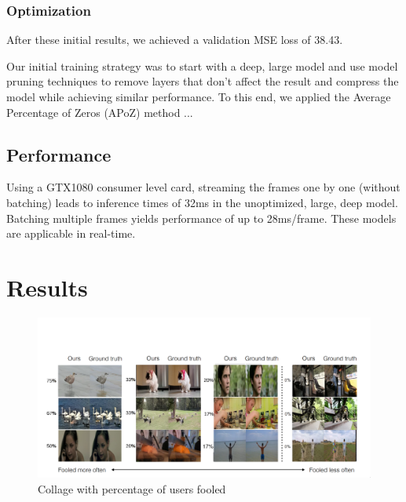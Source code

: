 \documentclass[12pt,openright,oneside,a4paper,english]{abntex2}
\begin{document}
\begin{otherlanguage}{english}
\subsection{Optimization}
After these initial results, we achieved a validation MSE loss of 38.43.

Our initial training strategy was to start with a deep, large model and use model pruning techniques to remove layers that don't affect the result and compress the model while achieving similar performance. To this end, we applied the Average Percentage of Zeros (APoZ) method ...

\section{Performance}
Using a GTX1080 consumer level card, streaming the frames one by one (without batching) leads to inference times of 32ms in the unoptimized, large, deep model. Batching multiple frames yields performance of up to 28ms/frame. These models are applicable in real-time.



\chapter{Results}

\begin{figure}[!htb]
\centering
\includegraphics[width=\textwidth+20pt]{fool_collage}
\caption{Collage with percentage of users fooled}
\label{fool_collage}
\end{figure}


\end{otherlanguage}
\end{document}
